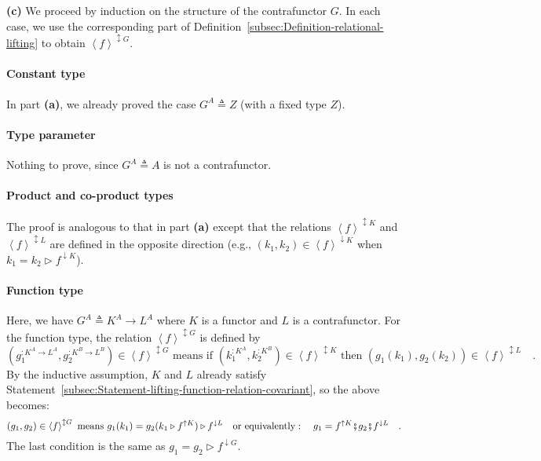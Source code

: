 \textbf{(c)} We proceed by induction on the structure of the contrafunctor
$G$. In each case, we use the corresponding part of Definition~\ref{subsec:Definition-relational-lifting}
to obtain $\left<f\right>^{\updownarrow G}$.

\paragraph{Constant type}

In part \textbf{(a)}, we already proved the case $G^{A}\triangleq Z$
(with a fixed type $Z$).

\paragraph{Type parameter}

Nothing to prove, since $G^{A}\triangleq A$ is not a contrafunctor.

\paragraph{Product and co-product types}

The proof is analogous to that in part \textbf{(a)} except that the
relations $\left<f\right>^{\updownarrow K}$ and $\left<f\right>^{\updownarrow L}$
are defined in the opposite direction (e.g., $(k_{1},k_{2})\in\left<f\right>^{\downarrow K}$
when $k_{1}=k_{2}\triangleright f^{\downarrow K}$).

\paragraph{Function type}

Here, we have $G^{A}\triangleq K^{A}\rightarrow L^{A}$ where $K$
is a functor and $L$ is a contrafunctor. For the function type, the
relation $\left<f\right>^{\updownarrow G}$ is defined by
\[
(g_{1}^{:K^{A}\rightarrow L^{A}},g_{2}^{:K^{B}\rightarrow L^{B}})\in\left<f\right>^{\updownarrow G}\text{ means if }(k_{1}^{:K^{A}},k_{2}^{:K^{B}})\in\left<f\right>^{\updownarrow K}\text{ then }(g_{1}(k_{1}),g_{2}(k_{2}))\in\left<f\right>^{\updownarrow L}\quad.
\]
By the inductive assumption, $K$ and $L$ already satisfy Statement~\ref{subsec:Statement-lifting-function-relation-covariant},
so the above becomes:
\[
(g_{1},g_{2})\in\left<f\right>^{\updownarrow G}\text{ means }g_{1}(k_{1})=g_{2}(k_{1}\triangleright f^{\uparrow K})\triangleright f^{\downarrow L}\quad\text{or equivalently}:\quad g_{1}=f^{\uparrow K}\bef g_{2}\bef f^{\downarrow L}\quad.
\]
The last condition is the same as $g_{1}=g_{2}\triangleright f^{\downarrow G}$.

